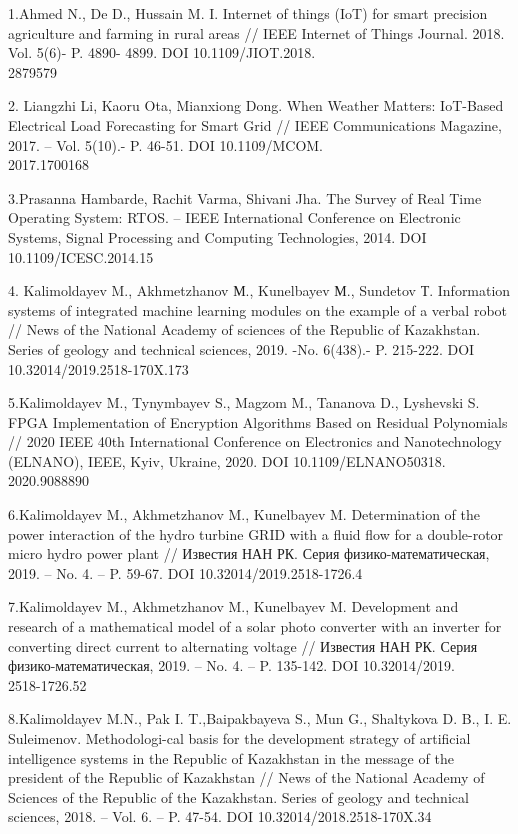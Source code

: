 \begin{noparindent}
1.Ahmed N., De D., Hussain M. I. Internet of things (IoT) for smart
precision agriculture and farming in rural areas // IEEE Internet of
Things Journal. 2018. Vol. 5(6)- P. 4890- 4899. DOI 10.1109/JIOT.2018.\\2879579

2. Liangzhi Li, Kaoru Ota, Mianxiong Dong. When Weather Matters:
IoT-Based Electrical Load Forecasting for Smart Grid // IEEE
Communications Magazine, 2017. -- Vol. 5(10).- P. 46-51. DOI
10.1109/MCOM.\\2017.1700168

3.Prasanna Hambarde, Rachit Varma, Shivani Jha. The Survey of Real Time
Operating System: RTOS. -- IEEE International Conference on Electronic
Systems, Signal Processing and Computing Technologies, 2014. DOI
10.1109/ICESC.2014.15

4. Kalimoldayev M., Akhmetzhanov М., Kunelbayev М., Sundetov Т.
Information systems of integrated machine learning modules on the
example of a verbal robot // News of the National Academy of sciences of
the Republic of Kazakhstan. Series of geology and technical sciences,
2019. -No. 6(438).- P. 215-222. DOI 10.32014/2019.2518-170X.173

5.Kalimoldayev M., Tynymbayev S., Magzom M., Tananova D., Lyshevski S.
FPGA Implementation of Encryption Algorithms Based on Residual
Polynomials // 2020 IEEE 40th International Conference on Electronics
and Nanotechnology (ELNANO), IEEE, Kyiv, Ukraine, 2020. DOI
10.1109/ELNANO50318.\\2020.9088890

6.Kalimoldayev M., Akhmetzhanov M., Kunelbayev M. Determination of the
power interaction of the hydro turbine GRID with a fluid flow for a
double-rotor micro hydro power plant // Известия НАН РК. Серия
физико-математическая, 2019. -- No. 4. -- P. 59-67.
DOI 10.32014/2019.2518-1726.4

7.Kalimoldayev M., Akhmetzhanov M., Kunelbayev M. Development and
research of a mathematical model of a solar photo converter with an
inverter for converting direct current to alternating voltage //
Известия НАН РК. Серия физико-математическая, 2019. -- No. 4. -- P.
135-142. DOI 10.32014/2019.\\2518-1726.52

8.Kalimoldayev M.N., Pak I. T.,Baipakbayeva S., Mun G., Shaltykova D.
B., I. E. Suleimenov. 
Methodologi-cal basis for the development strategy of artificial
intelligence systems in the Republic of Kazakhstan in the message of the
president of the Republic of Kazakhstan // News of the National Academy
of Sciences of the Republic of the Kazakhstan. Series of geology and
technical sciences, 2018. -- Vol. 6. -- P. 47-54. DOI
10.32014/2018.2518-170X.34


\end{noparindent}
